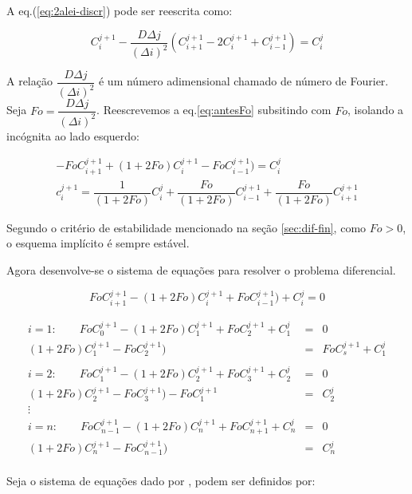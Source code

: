 A eq.(\ref{eq:2alei-discr}) pode ser reescrita como:

\begin{equation}
\label{eq:antesFo}
C_i^{j+1} - \frac{D\Delta j}{(\Delta i)^2} (C_{i+1}^{j+1} - 2C_i^{j+1} + C_{i-1}^{j+1}) = C_i^j
\end{equation}

A relação $\dfrac{D\Delta j}{(\Delta i)^2}$ é um número adimensional chamado de número de Fourier. Seja $Fo = \dfrac{D\Delta j}{(\Delta i)^2} $. Reescrevemos a eq.\ref{eq:antesFo} subsitindo com $Fo$, isolando a incógnita ao lado esquerdo:

\begin{gather*}
\label{eq:depoisFo}
- FoC_{i+1}^{j+1} + (1+2Fo)C_i^{j+1} - FoC_{i-1}^{j+1}) = C_i^j \\
c_i^{j+1} = \dfrac{1}{(1+2Fo)}C_i^j + \dfrac{Fo}{(1+2Fo)}C_{i-1}^{j+1} + \dfrac{Fo}{(1+2Fo)}C_{i+1}^{j+1}
\end{gather*}

Segundo o critério de estabilidade mencionado na seção \ref{sec:dif-fin}, como $Fo>0$, o esquema implícito é sempre estável.

Agora desenvolve-se o sistema de equações para resolver o problema diferencial.

\begin{equation*}
FoC_{i+1}^{j+1} - (1+2Fo)C_i^{j+1} + FoC_{i-1}^{j+1}) + C_i^j = 0
\end{equation*}

\begin{equation*}
\label{eq:depoisFo}
\begin{matrix}
i = 1: \qquad FoC_{0}^{j+1} - (1+2Fo)C_1^{j+1} + FoC_{2}^{j+1} + C_1^j & = & 0\\
(1+2Fo)C_1^{j+1} - FoC_{2}^{j+1})& = & FoC_{s}^{j+1}  + C_1^j \\ 
\\
i = 2: \qquad FoC_{1}^{j+1} - (1+2Fo)C_2^{j+1} + FoC_{3}^{j+1} + C_2^j & = & 0\\
(1+2Fo)C_2^{j+1} - FoC_{3}^{j+1}) - FoC_{1}^{j+1} & = & C_2^j \\ 
\vdots \\
i = n: \qquad FoC_{n-1}^{j+1} - (1+2Fo)C_n^{j+1} + FoC_{n+1}^{j+1} + C_n^j & = & 0\\
(1+2Fo)C_n^{j+1} - FoC_{n-1}^{j+1}) & = & C_n^j \\ 
\end{matrix}
\end{equation*}

Seja o sistema de equações dado por ,  podem ser definidos por:


